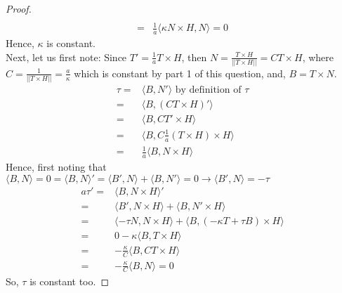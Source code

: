 \documentclass[12pt]{amsart}
\begin{document}
\begin{proof}
\begin{align*}
	\\=&\frac{1}{a}\langle\kappa N\times H,N\rangle=0
\end{align*}
Hence, $\kappa$ is constant.
\\Next, let us first note: Since $T'=\frac{1}{a}T\times H$, then $N=\frac{T\times H}{||T\times H||}=CT\times H$, where $C=\frac{1}{||T\times H||}=\frac{a}{\kappa}$ which is constant by part 1 of this question, and, $B=T\times N$.
\begin{align*}
	\tau=&\langle B,N'\rangle\text{ by definition of $\tau$}
	\\=&\langle B, (CT\times H)'\rangle
	\\=&\langle B, CT'\times H\rangle
	\\=&\langle B, C\frac{1}{a}(T\times H)\times H\rangle
	\\=&\frac{1}{a}\langle B,N\times H\rangle
\end{align*}
Hence, first noting that $\langle B,N\rangle=0=\langle B,N\rangle'=\langle B',N\rangle+\langle B,N'\rangle=0\rightarrow\langle B',N\rangle=-\tau$
\begin{align*}
	a\tau'=&\langle B,N\times H\rangle'
	\\=&\langle B',N\times H\rangle +\langle B,N'\times H\rangle
	\\=&\langle -\tau N, N\times H\rangle + \langle B,(-\kappa T+\tau B)\times H\rangle
	\\=&0-\kappa\langle B,T\times H\rangle
	\\=&-\frac{\kappa}{C}\langle B,CT\times H\rangle
	\\=&-\frac{\kappa}{C}\langle B,N\rangle=0
\end{align*}
So, $\tau$ is constant too.
\end{proof}
\end{document}
